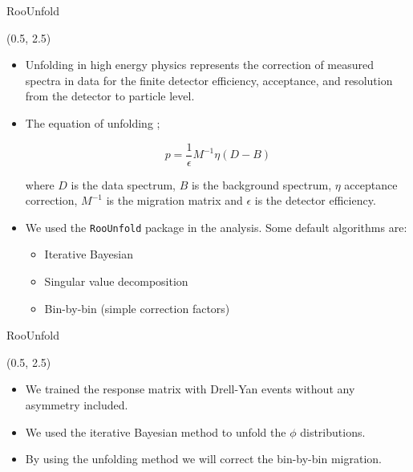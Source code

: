 \documentclass[10pt, xcolor={dvipsnames}, aspectratio = 169]{beamer}
\newcommand{\citeme}[1]{{\tiny \footfullcite{#1}}}
\begin{document}
\begin{frame}[fragile]{RooUnfold}

\begin{textblock}{14.0}(0.5, 2.5)

\begin{itemize}

\item Unfolding in high energy physics represents the correction of measured spectra in data for the finite detector efficiency, acceptance, and resolution from the detector to particle level.

\item The equation of unfolding ;

\begin{equation*}
p = \frac{1}{\epsilon} M^{-1} \eta (D-B)
\end{equation*}

where $D$ is the data spectrum, $B$ is the background spectrum, $\eta$ acceptance correction, $M^{-1}$ is the migration matrix and $\epsilon$ is the detector efficiency.

\item We used the \verb|RooUnfold| package in the analysis. Some default algorithms are:

\begin{itemize}
    \item Iterative Bayesian
    \item Singular value decomposition
    \item Bin-by-bin (simple correction factors)
\end{itemize}

\end{itemize}

\end{textblock}

\end{frame}

\begin{frame}{RooUnfold}
\begin{textblock}{14.0}(0.5, 2.5)
\begin{itemize}
    \item We trained the response matrix with Drell-Yan events without any asymmetry included.
    \item We used the iterative Bayesian method to unfold the $\phi$ distributions. \citeme{Wynne:2012jb}
    \item By using the unfolding method we will correct the bin-by-bin migration.
\end{itemize}
\end{textblock}
\end{frame}
\end{document}
